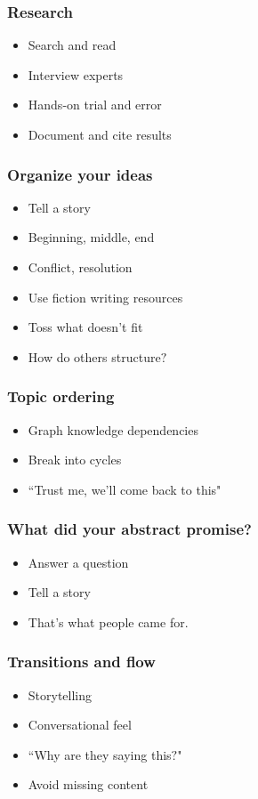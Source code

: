 \documentclass{beamer}
\begin{document}
\begin{frame}[fragile]
\frametitle{Research}
\begin{itemize}
\item Search and read
\item Interview experts
\item Hands-on trial and error
\item Document and cite results
\end{itemize}
\end{frame}

\begin{frame}[fragile]
\frametitle{Organize your ideas}
\begin{itemize}
\item Tell a story
\item Beginning, middle, end
\item Conflict, resolution
\item Use fiction writing resources
\item Toss what doesn't fit
\item How do others structure$?$
\end{itemize}
\end{frame}

\begin{frame}[fragile]
\frametitle{Topic ordering}
\begin{itemize}
\item Graph knowledge dependencies
\item Break into cycles
\item ``Trust me, we'll come back to this"
\end{itemize}
\end{frame}

\begin{frame}[fragile]
\frametitle{What did your abstract promise?}
\begin{itemize}
\item Answer a question
\item Tell a story
\item That's what people came for.
\end{itemize}
\end{frame}

\begin{frame}[fragile]
\frametitle{Transitions and flow}
\begin{itemize}
\item Storytelling
\item Conversational feel
\item ``Why are they saying this$?$"
\item Avoid missing content
\end{itemize}
\end{frame}
\end{document}
